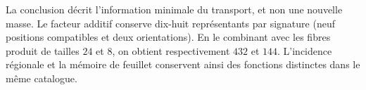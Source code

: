 La conclusion décrit l'information minimale du transport, et non une
nouvelle masse. Le facteur additif conserve dix-huit représentants par signature
(neuf positions compatibles et deux orientations). En le combinant avec les
fibres produit de tailles \(24\) et \(8\), on obtient respectivement
\(432\) et \(144\). L'incidence régionale et la mémoire de feuillet conservent
ainsi des fonctions distinctes dans le même catalogue.
